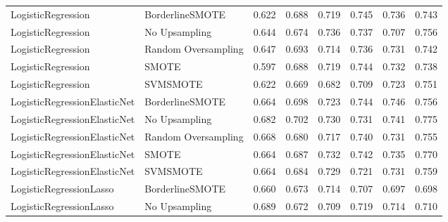 \begin{tabular}{llllllll}
          LogisticRegression &     BorderlineSMOTE & 0.622 &                     0.688 &                 0.719 &                  0.745 &                                   0.736 &    0.743 \\
          LogisticRegression &       No Upsampling & 0.644 &                     0.674 &                 0.736 &                  0.737 &                                   0.707 &    0.756 \\
          LogisticRegression & Random Oversampling & 0.647 &                     0.693 &                 0.714 &                  0.736 &                                   0.731 &    0.742 \\
          LogisticRegression &               SMOTE & 0.597 &                     0.688 &                 0.719 &                  0.744 &                                   0.732 &    0.738 \\
          LogisticRegression &            SVMSMOTE & 0.622 &                     0.669 &                 0.682 &                  0.709 &                                   0.723 &    0.751 \\
LogisticRegressionElasticNet &     BorderlineSMOTE & 0.664 &                     0.698 &                 0.723 &                  0.744 &                                   0.746 &    0.756 \\
LogisticRegressionElasticNet &       No Upsampling & 0.682 &                     0.702 &                 0.730 &                  0.731 &                                   0.741 &    0.775 \\
LogisticRegressionElasticNet & Random Oversampling & 0.668 &                     0.680 &                 0.717 &                  0.740 &                                   0.731 &    0.755 \\
LogisticRegressionElasticNet &               SMOTE & 0.664 &                     0.687 &                 0.732 &                  0.742 &                                   0.735 &    0.770 \\
LogisticRegressionElasticNet &            SVMSMOTE & 0.664 &                     0.684 &                 0.729 &                  0.721 &                                   0.731 &    0.759 \\
     LogisticRegressionLasso &     BorderlineSMOTE & 0.660 &                     0.673 &                 0.714 &                  0.707 &                                   0.697 &    0.698 \\
     LogisticRegressionLasso &       No Upsampling & 0.689 &                     0.672 &                 0.709 &                  0.719 &                                   0.714 &    0.710 \\

\end{tabular}
